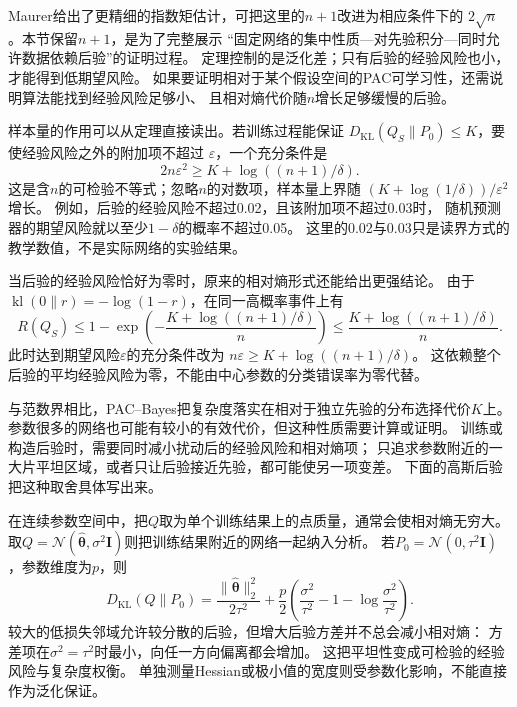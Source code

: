 Maurer给出了更精细的指数矩估计，可把这里的$n+1$改进为相应条件下的
$2\sqrt n$。本节保留$n+1$，是为了完整展示
“固定网络的集中性质—对先验积分—同时允许数据依赖后验”的证明过程。
定理控制的是泛化差；只有后验的经验风险也小，才能得到低期望风险。
如果要证明相对于某个假设空间的PAC可学习性，还需说明算法能找到经验风险足够小、
且相对熵代价随$n$增长足够缓慢的后验。

样本量的作用可以从定理直接读出。若训练过程能保证
$D_{\mathrm{KL}}(Q_S\|P_0)\leq K$，要使经验风险之外的附加项不超过
$\varepsilon$，一个充分条件是
\begin{equation}
 2n\varepsilon^2\geq K+\log((n+1)/\delta).
 \label{eq:pac-bayes-sample-requirement}
\end{equation}
这是含$n$的可检验不等式；忽略$n$的对数项，样本量上界随
$(K+\log(1/\delta))/\varepsilon^2$增长。
例如，后验的经验风险不超过0.02，且该附加项不超过0.03时，
随机预测器的期望风险就以至少$1-\delta$的概率不超过0.05。
这里的0.02与0.03只是读界方式的教学数值，不是实际网络的实验结果。

当后验的经验风险恰好为零时，原来的相对熵形式还能给出更强结论。
由于$\operatorname{kl}(0\|r)=-\log(1-r)$，在同一高概率事件上有
\[
 R(Q_S)\leq1-\exp\left(-\frac{K+\log((n+1)/\delta)}n\right)
 \leq\frac{K+\log((n+1)/\delta)}n.
\]
此时达到期望风险$\varepsilon$的充分条件改为
$n\varepsilon\geq K+\log((n+1)/\delta)$。
这依赖整个后验的平均经验风险为零，不能由中心参数的分类错误率为零代替。

与范数界相比，PAC--Bayes把复杂度落实在相对于独立先验的分布选择代价$K$上。
参数很多的网络也可能有较小的有效代价，但这种性质需要计算或证明。
训练或构造后验时，需要同时减小扰动后的经验风险和相对熵项；
只追求参数附近的一大片平坦区域，或者只让后验接近先验，都可能使另一项变差。
下面的高斯后验把这种取舍具体写出来。

在连续参数空间中，把$Q$取为单个训练结果上的点质量，通常会使相对熵无穷大。
取$Q=\mathcal N(\hat{\bm\theta},\sigma^2\bm I)$则把训练结果附近的网络一起纳入分析。
若$P_0=\mathcal N(0,\tau^2\bm I)$，参数维度为$p$，则
\begin{equation}
 D_{\mathrm{KL}}(Q\|P_0)=\frac{\|\hat{\bm\theta}\|_2^2}{2\tau^2}
 +\frac p2\left(\frac{\sigma^2}{\tau^2}-1-\log\frac{\sigma^2}{\tau^2}\right).
 \label{eq:gaussian-pac-bayes-kl}
\end{equation}
较大的低损失邻域允许较分散的后验，但增大后验方差并不总会减小相对熵：
方差项在$\sigma^2=\tau^2$时最小，向任一方向偏离都会增加。
这把平坦性变成可检验的经验风险与复杂度权衡。
单独测量Hessian或极小值的宽度则受参数化影响，不能直接作为泛化保证。

